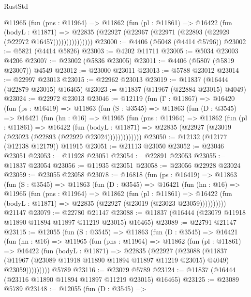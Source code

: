 \begin{lexlean}{RustStd}
\begin{coremodule}
{\begin{coremodule}
{{{{{{{{{{{{{{{{{{{{{{{{{{{{{{{{{{{{{{{{{{{{{{{{{{              @11965
                (fun (pns : @11964) =>
                @11862
                  (fun (pl : @11861) =>
                  @16422
                    (fun (bodyL : @11871) =>
                    @22835 (@22927 (@22967 (@22971 (@22893 (@22929 (@22972 @16457)))))))))))))))
@23000 := @4406 (@5048 (@4414 @5796))
@23002 := @5821 (@4414 @5826)
@23003 := @4202 @11711
@23005 := @5034 @23003 @4206
@23007 := @23002 (@5836 @23005)
@23011 := @4406 (@5807 (@5819 @23007)) @4549
@23012 := @23000 @23011
@23013 := @5788 @23012
@23014 := @22997 @23013
@23015 := @22962 @23013
@23019 := @11837 (@16444 (@22879 @23015) @16465)
@23023 := @11837 (@11967 (@22884 @23015) @4049)
@23024 := @22972 @23013
@23046 := @12119
    (fun (Γ : @11867) =>
    @16420
      (fun (ps : @16419) =>
      @11863
        (fun (S : @3545) =>
        @11863
          (fun (D : @3545) =>
          @16421
            (fun (hn : @16) =>
            @11965
              (fun (pns : @11964) =>
              @11862
                (fun (pl : @11861) =>
                @16422
                  (fun (bodyL : @11871) =>
                  @22835 (@22927 (@23019 (@23023 (@22893 (@22929 @23024)))))))))))))
@23050 := @12132 (@12177 (@12138 @12179)) @11915
@23051 := @21113 @23050
@23052 := @23046 @23051
@23053 := @11928 @23051
@23054 := @22891 @23053
@23055 := @11837 @23054
@23056 := @11935 @23051
@23058 := @23056 @22928 @23024
@23059 := @23055 @23058
@23078 := @16818
    (fun (ps : @16419) =>
    @11863
      (fun (S : @3545) =>
      @11863
        (fun (D : @3545) =>
        @16421
          (fun (hn : @16) =>
          @11965
            (fun (pns : @11964) =>
            @11862
              (fun (pl : @11861) =>
              @16422 (fun (bodyL : @11871) => @22835 (@22927 (@23019 (@23023 @23059))))))))))
    @21147
@23079 := @22780 @21147
@23088 := @11837 (@16444 (@23079 @11918 @11890 @11894 @11897 @11219 @23015) @16465)
@23089 := @22791 @21147
@23115 := @12055
    (fun (S : @3545) =>
    @11863
      (fun (D : @3545) =>
      @16421
        (fun (hn : @16) =>
        @11965
          (fun (pns : @11964) =>
          @11862
            (fun (pl : @11861) =>
            @16422
              (fun (bodyL : @11871) =>
              @22835
                (@22927
                  (@23088
                    (@11837
                      (@11967 (@23089 @11918 @11890 @11894 @11897 @11219 @23015) @4049)
                      @23059)))))))))
    @5789
@23116 := @23079 @5789
@23124 := @11837 (@16444 (@23116 @11890 @11894 @11897 @11219 @23015) @16465)
@23125 := @23089 @5789
@23148 := @12055
    (fun (D : @3545) =>
}}}}}}}}}}}}}}}}}}}}}}}}}}}}}}}}}}}}}}}}}}}}}}}}}}
\end{coremodule}}
\end{coremodule}
\end{lexlean}
